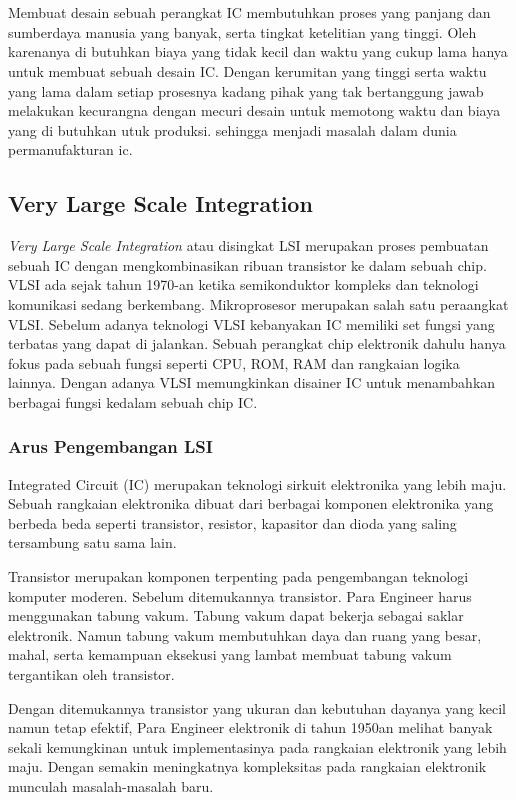 \chapter{\babDua}
Membuat desain sebuah perangkat IC membutuhkan proses yang panjang dan sumberdaya manusia yang banyak, serta tingkat ketelitian yang tinggi. Oleh karenanya di butuhkan biaya yang tidak kecil dan waktu yang cukup lama hanya untuk membuat sebuah desain IC. Dengan kerumitan yang tinggi serta waktu yang lama dalam setiap prosesnya kadang pihak yang tak bertanggung jawab melakukan kecurangna dengan mecuri desain untuk memotong waktu dan biaya yang di butuhkan utuk produksi. sehingga menjadi masalah dalam dunia permanufakturan ic. \cite{Azriel2017}

\section{Very Large Scale Integration}
\textit{Very Large Scale Integration} atau disingkat LSI merupakan proses pembuatan sebuah IC dengan mengkombinasikan ribuan transistor ke dalam sebuah chip. VLSI ada sejak tahun 1970-an ketika semikonduktor kompleks dan teknologi komunikasi sedang berkembang. Mikroprosesor merupakan salah satu peraangkat VLSI. Sebelum adanya teknologi VLSI kebanyakan IC memiliki set fungsi yang terbatas yang dapat di jalankan. Sebuah perangkat chip elektronik dahulu hanya fokus pada sebuah fungsi seperti CPU, ROM, RAM dan rangkaian logika lainnya. Dengan adanya VLSI memungkinkan disainer IC untuk menambahkan berbagai fungsi kedalam sebuah chip IC. \cite{vlsi.hist} 

\subsection{Arus Pengembangan LSI}
Integrated Circuit (IC) merupakan teknologi sirkuit elektronika yang lebih maju. Sebuah rangkaian elektronika dibuat dari berbagai komponen elektronika yang berbeda beda seperti transistor, resistor, kapasitor dan dioda yang saling tersambung satu sama lain. \cite{vlsi.hist}

Transistor merupakan komponen terpenting pada pengembangan teknologi komputer moderen. Sebelum ditemukannya transistor. Para Engineer harus menggunakan tabung vakum. Tabung vakum dapat bekerja sebagai saklar elektronik. Namun tabung vakum membutuhkan daya dan ruang yang besar, mahal, serta kemampuan eksekusi yang lambat membuat tabung vakum tergantikan oleh transistor.

Dengan ditemukannya transistor yang ukuran dan kebutuhan dayanya yang kecil namun tetap efektif, Para Engineer elektronik di tahun 1950an melihat banyak sekali kemungkinan untuk implementasinya pada rangkaian elektronik yang lebih maju. Dengan semakin meningkatnya kompleksitas pada rangkaian elektronik munculah masalah-masalah baru.

